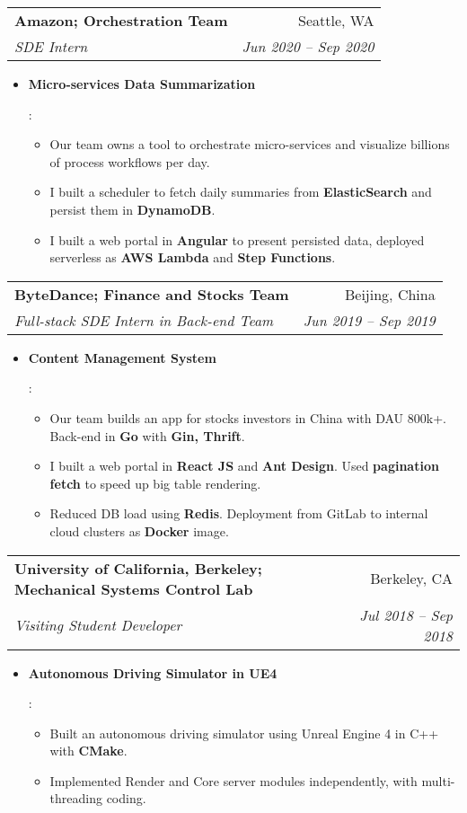 \documentclass[letterpaper,11pt]{article}
\makeatletter
\newcommand{\resumeItem}[2]{
  \item\small{
    \textbf{#1}{: #2 \vspace{-2pt}}
  }
}
\newcommand{\resumeSubheading}[4]{
  \vspace{-1pt}\item
    \begin{tabular*}{0.97\textwidth}[t]{l@{\extracolsep{\fill}}r}
      \textbf{#1} & #2 \\
      \textit{\small#3} & \textit{\small #4} \\
    \end{tabular*}\vspace{-5pt}
}
\newcommand{\resumeItemListStart}{\begin{itemize}}
\newcommand{\resumeItemListEnd}{\end{itemize}\vspace{-5pt}}
\makeatother
\begin{document}
    \resumeSubheading
      {Amazon; Orchestration Team}{Seattle, WA}
      {SDE Intern}{Jun 2020 -- Sep 2020}
      \resumeItemListStart
        \resumeItem{Micro-services Data Summarization}{
          \begin{itemize}
            \item Our team owns a tool to orchestrate micro-services and visualize billions of process workflows per day.
            \item I built a scheduler to fetch daily summaries from \textbf{ElasticSearch} and persist them in \textbf{DynamoDB}.
            \item I built a web portal in \textbf{Angular} to present persisted data, deployed serverless as \textbf{AWS Lambda} and \textbf{Step Functions}.
          \end{itemize}
        }
      \resumeItemListEnd

    \resumeSubheading
      {ByteDance; Finance and Stocks Team}{Beijing, China}
      {Full-stack SDE Intern in Back-end Team}{Jun 2019 -- Sep 2019}
      \resumeItemListStart
        \resumeItem{Content Management System}{
          \begin{itemize}
            \item Our team builds an app for stocks investors in China with DAU 800k+. Back-end in \textbf{Go} with \textbf{Gin, Thrift}.
            \item I built a web portal in \textbf{React JS} and \textbf{Ant Design}. Used \textbf{pagination fetch} to speed up big table rendering.
            \item Reduced DB load using \textbf{Redis}. Deployment from GitLab to internal cloud clusters as \textbf{Docker} image.
          \end{itemize}
        }
      \resumeItemListEnd

    \resumeSubheading
      {University of California, Berkeley; Mechanical Systems Control Lab}{Berkeley, CA}
      {Visiting Student Developer}{Jul 2018 -- Sep 2018}
      \resumeItemListStart
        \resumeItem{Autonomous Driving Simulator in UE4}{
          \begin{itemize}
            \item Built an autonomous driving simulator using Unreal Engine 4 in C++ with \textbf{CMake}.
            \item Implemented Render and Core server modules independently, with multi-threading coding.
          \end{itemize}
        }
      \resumeItemListEnd
\end{document}

